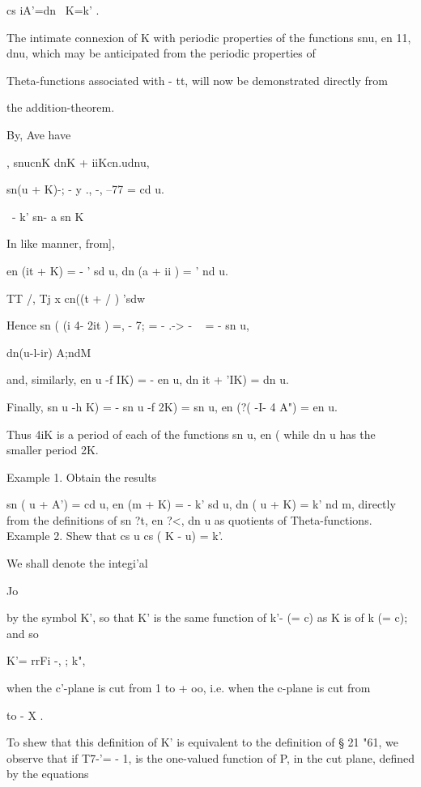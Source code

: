 cs iA'=dn \ K=k' .


The intimate connexion of K with periodic properties of the functions
snu, en 11, dnu, which may be anticipated from the periodic properties
of

Theta-functions associated with - tt, will now be demonstrated
directly from

the addition-theorem.

By, Ave have

, snucnK dnK + iiKcn.udnu,

sn(u + K)-; - y ., -, --77 = cd u.

  \ - k' sn- a sn K

In like manner, from],

en (it + K) = - ' sd u, dn (a + ii ) = ' nd u.

TT /, Tj x cn((t + / ) 'sdw

Hence sn ( (i 4- 2it ) =, - 7; = - .-> - ~ = - sn u,

  dn(u-l-ir) A;ndM

and, similarly, en u -f IK) = - en u, dn it + 'IK) = dn u.

Finally, sn u -h K) = - sn u -f 2K) = sn u, en (?( -I- 4 A") = en u.

Thus 4iK is a period of each of the functions sn u, en ( while dn u
has the smaller period 2K.

Example 1. Obtain the results

sn ( u + A') = cd u, en (m + K) = - k' sd u, dn ( u + K) = k' nd m,
directly from the definitions of sn ?t, en ?<, dn u as quotients of
Theta-functions. Example 2. Shew that cs u cs ( K - u) = k'.

%
%

We shall denote the integi'al

Jo

by the symbol K', so that K' is the same function of k'- (= c) as K is
of k (= c); and so

K'= rrFi -, ; k",

when the c'-plane is cut from 1 to + oo, i.e. when the c-plane is cut
from

to - X .

To shew that this definition of K' is equivalent to the definition of
§ 21 "61, we observe that if T7-'= - 1, is the one-valued function of
P, in the cut plane, defined by the equations

